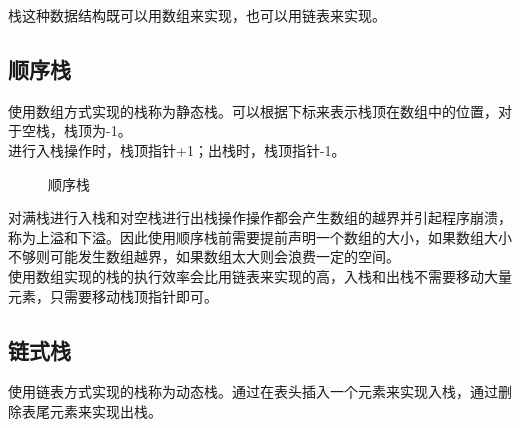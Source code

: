 栈这种数据结构既可以用数组来实现，也可以用链表来实现。

\subsection{顺序栈}

使用数组方式实现的栈称为静态栈。可以根据下标来表示栈顶在数组中的位置，对于空栈，栈顶为-1。 \\

进行入栈操作时，栈顶指针+1；出栈时，栈顶指针-1。 \\

\begin{figure}[H]
    \centering
    \caption{顺序栈}
\end{figure}

对满栈进行入栈和对空栈进行出栈操作操作都会产生数组的越界并引起程序崩溃，称为上溢和下溢。因此使用顺序栈前需要提前声明一个数组的大小，如果数组大小不够则可能发生数组越界，如果数组太大则会浪费一定的空间。 \\

使用数组实现的栈的执行效率会比用链表来实现的高，入栈和出栈不需要移动大量元素，只需要移动栈顶指针即可。 \\

\subsection{链式栈}

使用链表方式实现的栈称为动态栈。通过在表头插入一个元素来实现入栈，通过删除表尾元素来实现出栈。 \\

